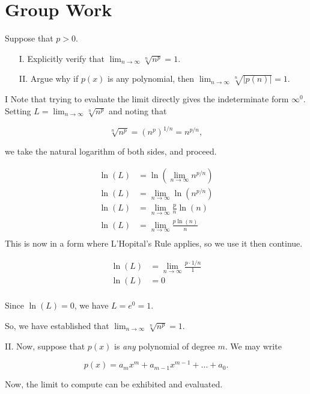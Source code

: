\documentclass[noauthor,handout]{ximera}
\begin{document}
\section{Group Work}

\begin{problem}
Suppose that $p>0$.  

\begin{itemize}
\item[I.] Explicitly verify that $\lim_{n \to \infty} \sqrt[n]{n^p}=1$.  
\item[II.] Argue why if $p(x)$ is any polynomial, then $\lim_{n \to \infty} \sqrt[n]{|p(n)|} =1$.
\end{itemize}

\begin{freeResponse}
I Note that trying to evaluate the limit directly gives the indeterminate form $\infty^0$.  Setting $L= \lim_{n \to \infty} \sqrt[n]{n^p}$ and noting that 

\[
\sqrt[n]{n^p} = \left(n^p\right)^{1/n} = n^{p/n},
\]

we take the natural logarithm of both sides, and proceed.

\begin{align*}
\ln(L) & = \ln\left( \lim_{n \to \infty} n^{p/n} \right) \\
\ln(L) & =  \lim_{n \to \infty} \ln\left(n^{p/n} \right) \\
\ln(L) & =  \lim_{n \to \infty} \frac{p}{n}\ln(n) \\
\ln(L) & =  \lim_{n \to \infty} \frac{p\ln(n)}{n} \\
\end{align*}
This is now in a form where L'Hopital's Rule applies, so we use it then continue.

\begin{align*}
\ln(L) & =  \lim_{n \to \infty} \frac{p\cdot{1/n}}{1} \\
\ln(L) & = 0 \\
\end{align*}

Since $\ln(L) = 0$, we have $L=e^0 = 1$.


So, we have established that $\lim_{n \to \infty} \sqrt[n]{n^p}=1$.  

II. Now, suppose that $p(x)$ is \emph{any} polynomial of degree $m$.  We may write

\[
p(x) = a_mx^m+a_{m-1}x^{m-1}+ \ldots + a_0.
\]  

Now, the limit to compute can be exhibited and evaluated.


\end{freeResponse}
\end{problem}
\end{document}
